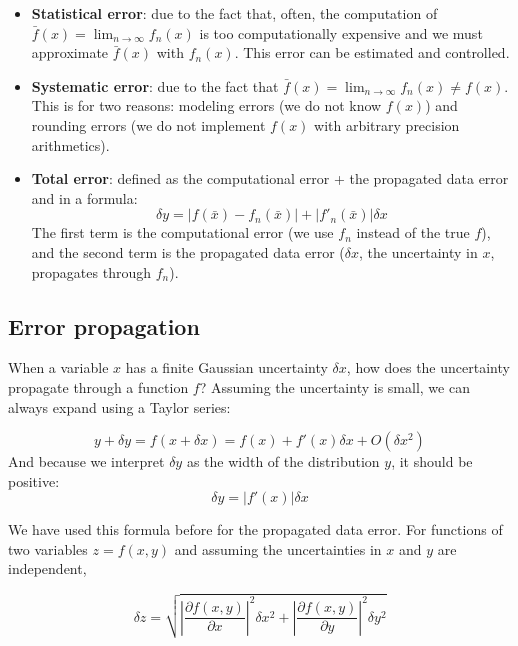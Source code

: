 \documentclass[justified, sixbynine]{tufte-book}
\theoremstyle{plain}%
\newtheorem * {corollary}{Corollary}
\theoremstyle{definition}
\theoremstyle{remark}
\newtheorem * {remark}{Remark}
\newtheorem * {note}{Note}
\begin{document}
\begin{fullwidth}
\begin{itemize}
\item {\bf Statistical error}: due to the fact that, often, the computation of $\bar f(x) = \lim_{n\rightarrow\infty} f_n(x)$ is too computationally expensive and we must approximate $\bar f(x)$ with $f_n(x)$. This error can be estimated and controlled.

\item {\bf Systematic error}: due to the fact that $\bar f(x) = \lim_{n\rightarrow\infty} f_n(x) \neq f(x)$. This is for two reasons: modeling errors (we do not know $f(x)$) and rounding errors (we do not implement $f(x)$ with arbitrary precision arithmetics).

\item {\bf Total error}: defined as the computational error + the propagated data error and in a formula:
\begin{equation}
\delta y = |f(\bar x)-f_n(\bar x)| + |f'_n(\bar x)|\delta x
\end{equation}
The first term is the computational error (we use $f_n$ instead of the true $f$), and the second term is the propagated data error ($\delta x$, the uncertainty in $x$, propagates through $f_n$).
\end{itemize}


\goodbreak\subsection{Error propagation}


When a variable $x$ has a finite Gaussian uncertainty $\delta x$, how does the uncertainty propagate through a function $f$? Assuming the uncertainty is small, we can always expand using a Taylor series:

\begin{equation}
y+\delta y = f(x+\delta x) = f(x) + f'(x)\delta x + O(\delta x^2)
\end{equation}
And because we interpret $\delta y$ as the width of the distribution $y$, it should be positive:
\begin{equation}
  \delta y = |f'(x)|\delta x
\end{equation}

We have used this formula before for the propagated data error.
For functions of two variables $z = f(x, y)$ and assuming the uncertainties in $x$ and $y$ are independent, 

\begin{equation}
  \delta z = \sqrt{\left|\frac{\partial f(x, y)}{\partial x}\right|^2\delta x^2 +
\left|\frac{\partial f(x, y)}{\partial y}\right|^2\delta y^2 }
\end{equation}


\end{fullwidth}
\end{document}
